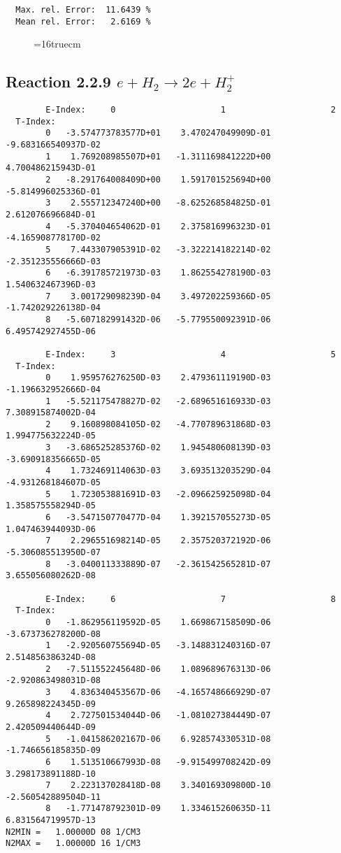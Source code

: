 \documentclass[12pt,dvipdfmx]{article}
\begin{document}
\begin{small}
\begin{verbatim}
  Max. rel. Error:  11.6439 %
  Mean rel. Error:   2.6169 %
\end{verbatim}\end{small}
\begin{figure} \label{2.2.5g}
\epsfxsize=16truecm
\end{figure}
\newpage


\subsection{
Reaction 2.2.9  $  e + H_2       \rightarrow 2e + H_2^+  $
}



\begin{small}\begin{verbatim}
        E-Index:     0                     1                     2
  T-Index:
        0   -3.574773783577D+01    3.470247049909D-01   -9.683166540937D-02
        1    1.769208985507D+01   -1.311169841222D+00    4.700486215943D-01
        2   -8.291764008409D+00    1.591701525694D+00   -5.814996025336D-01
        3    2.555712347240D+00   -8.625268584825D-01    2.612076696684D-01
        4   -5.370404654062D-01    2.375816996323D-01   -4.165908778170D-02
        5    7.443307905391D-02   -3.322214182214D-02   -2.351235556666D-03
        6   -6.391785721973D-03    1.862554278190D-03    1.540632467396D-03
        7    3.001729098239D-04    3.497202259366D-05   -1.742029226138D-04
        8   -5.607182991432D-06   -5.779550092391D-06    6.495742927455D-06

        E-Index:     3                     4                     5
  T-Index:
        0    1.959576276250D-03    2.479361119190D-03   -1.196632952666D-04
        1   -5.521175478827D-02   -2.689651616933D-03    7.308915874002D-04
        2    9.160898084105D-02   -4.770789631868D-03    1.994775632224D-05
        3   -3.686525285376D-02    1.945480608139D-03   -3.690918356665D-05
        4    1.732469114063D-03    3.693513203529D-04   -4.931268184607D-05
        5    1.723053881691D-03   -2.096625925098D-04    1.358575558294D-05
        6   -3.547150770477D-04    1.392157055273D-05    1.047463944093D-06
        7    2.296551698214D-05    2.357520372192D-06   -5.306085513950D-07
        8   -3.040011333889D-07   -2.361542565281D-07    3.655056080262D-08

        E-Index:     6                     7                     8
  T-Index:
        0   -1.862956119592D-05    1.669867158509D-06   -3.673736278200D-08
        1   -2.920560755694D-05   -3.148831240316D-07    2.514856386324D-08
        2   -7.511552245648D-06    1.089689676313D-06   -2.920863498031D-08
        3    4.836340453567D-06   -4.165748666929D-07    9.265898224345D-09
        4    2.727501534044D-06   -1.081027384449D-07    2.420509440644D-09
        5   -1.041586202167D-06    6.928574330531D-08   -1.746656185835D-09
        6    1.513510667993D-08   -9.915499708242D-09    3.298173891188D-10
        7    2.223137028418D-08    3.340169309800D-10   -2.560542889504D-11
        8   -1.771478792301D-09    1.334615260635D-11    6.831564719957D-13
N2MIN =   1.00000D 08 1/CM3
N2MAX =   1.00000D 16 1/CM3


\end{verbatim}
\end{small}
\end{document}
